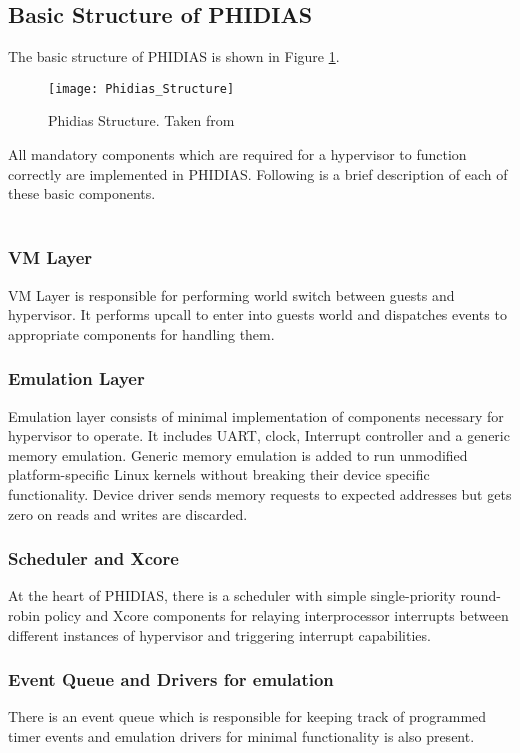 \subsection{Basic Structure of PHIDIAS}
The basic structure of PHIDIAS is shown in Figure \ref{Phidias_Structure}.

\begin{figure}[!htbp]
	\centering
	\texttt{[image: Phidias\_Structure]}
	\caption{Phidias Structure. Taken from \cite{Jan}}
	\label{Phidias_Structure}
\end{figure}

All mandatory components which are required for a hypervisor to function correctly are implemented in PHIDIAS. Following is a brief description of each of these basic components.\\
\\
\subsubsection{VM Layer}
VM Layer is responsible for performing world switch between guests and hypervisor. It performs upcall to enter into guests world and dispatches events to appropriate components for handling them. 
\subsubsection{Emulation Layer}
Emulation layer consists of minimal implementation of components necessary for hypervisor to operate. It includes UART, clock, Interrupt controller and a generic memory emulation. Generic memory emulation is added to run unmodified platform-specific Linux kernels without breaking their device specific functionality. Device driver sends memory requests to expected addresses but gets zero on reads and writes are discarded.
\subsubsection{Scheduler and Xcore}
At the heart of PHIDIAS, there is a scheduler with simple single-priority round-robin policy and Xcore components for relaying interprocessor interrupts between different instances of hypervisor and triggering interrupt capabilities.
\subsubsection{Event Queue and Drivers for emulation}
There is an event queue which is responsible for keeping track of programmed timer events and emulation drivers for minimal functionality is also present.

